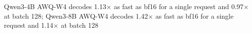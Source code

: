 Qwen3-4B AWQ-W4 decodes 1.13$\times$ as fast as bf16 for a single request and 0.97$\times$ at batch 128; Qwen3-8B AWQ-W4 decodes 1.42$\times$ as fast as bf16 for a single request and 1.14$\times$ at batch 128%
